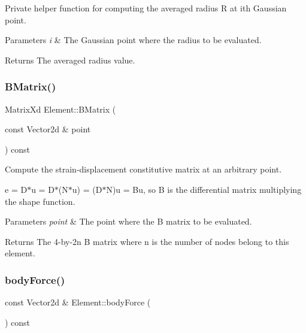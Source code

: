 Private helper function for computing the averaged radius R at ith Gaussian point. 


\begin{DoxyParams}{Parameters}
{\em i} & The Gaussian point where the radius to be evaluated. \\
\hline
\end{DoxyParams}
\begin{DoxyReturn}{Returns}
The averaged radius value. 
\end{DoxyReturn}
\mbox{\label{class_element_a19f8ba5c4c7569c3bcccf1b422a7dd89}} 
\subsubsection{\texorpdfstring{B\+Matrix()}{BMatrix()}}
{\footnotesize\ttfamily Matrix\+Xd Element\+::\+B\+Matrix (\begin{DoxyParamCaption}\item[{const Vector2d \&}]{point }\end{DoxyParamCaption}) const}



Compute the strain-\/displacement constitutive matrix at an arbitrary point. 

e = D$\ast$u = D$\ast$(N$\ast$u) = (D$\ast$N)u = Bu, so B is the differential matrix multiplying the shape function.


\begin{DoxyParams}{Parameters}
{\em point} & The point where the B matrix to be evaluated. \\
\hline
\end{DoxyParams}
\begin{DoxyReturn}{Returns}
The 4-\/by-\/2n B matrix where n is the number of nodes belong to this element. 
\end{DoxyReturn}
\mbox{\label{class_element_a990462393dee5227b711ca96a69c5516}} 
\subsubsection{\texorpdfstring{body\+Force()}{bodyForce()}}
{\footnotesize\ttfamily const Vector2d \& Element\+::body\+Force (\begin{DoxyParamCaption}{ }\end{DoxyParamCaption}) const}



